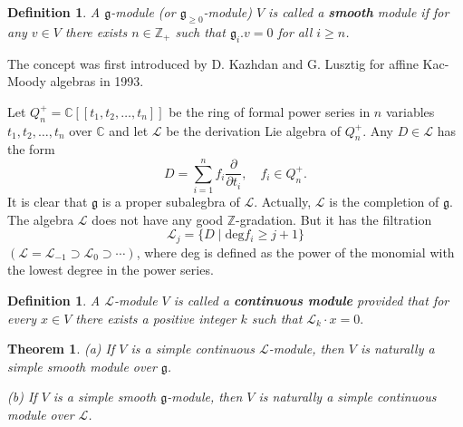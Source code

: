 \documentclass[12pt, a4paper]{amsart}
\newcommand{\fg}{\mathfrak g}
\newcommand{\C}{\mathbb{C}}
\newcommand{\Z}{\mathbb Z}
\theoremstyle{Theorem}
\theoremstyle{Theorem}
\newtheorem{theorem}[thm]{Theorem}
\newtheorem{definition}[thm]{Definition}
\numberwithin{equation}{section}
\begin{document}
\begin{definition}
	A $\fg$-module (or $\fg_{\geq0}$-module) $V$ is called a {\bf smooth} module
	if for any $v\in V$ there exists $n\in\Z_{+}$ such that $\fg_{i}.v=0$ for all $i\geq n$.
\end{definition}

The concept was first introduced  by D. Kazhdan and G. Lusztig  for   affine Kac-Moody algebras \cite{KL1, KL2} in 1993.

Let $Q_{n}^{+}=\C[[t_{1},t_{2},\dots,t_{n}]]$ be the ring of formal power series in $n$ variables $t_1,t_2,\dots,t_n$  over $\C$ and let $\mathcal{L}$ be the derivation Lie algebra of $Q_{n}^{+}$. Any $D \in \mathcal{L}$ has the form
$$D=\sum_{i=1}^{n}f_i\frac{\partial}{\partial t_i}, \quad f_i \in Q_{n}^{+}.$$
It is clear that $\mathfrak{g}$ is a proper subalegbra of  $\mathcal{L}$. Actually, $ \mathcal{L}$ is the completion of $\fg$.
The algebra $\mathcal{L}$ does not have any good $\mathbb{Z}$-gradation. But it has the filtration
$$\mathcal{L}_j = \{D \mid \text{deg} f_i \geq j+1\}$$$(\mathcal{L}= \mathcal{L}_{-1}\supset\mathcal{L}_{0}\supset\cdots)$,
where deg is defined as the power of the monomial with the lowest degree in the power series.

\begin{definition}\cite[Lemma 2.1]{R}
	A $\mathcal{L}$-module $V$ is called a {\bf continuous module} provided that for every $x\in V$ there exists a positive integer $k$ such that
	$
	\mathcal{L}_k\cdot x = 0.
	$
\end{definition}

\begin{theorem}\label{g_0-induce-module-height-geq2}
	(a) If $V$ is a simple continuous  $\mathcal{L}$-module, then $V$ is naturally a simple smooth module over $\fg$.
	
	(b) If $V$ is a simple smooth $\fg$-module, then $V$ is naturally a simple continuous module over $\mathcal{L}$.
\end{theorem}
\end{document}
